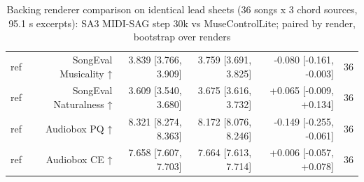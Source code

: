 \begin{table}[t]
\begin{tabular}{lrrrrr}
ref & SongEval Musicality ↑ & 3.839 [3.766, 3.909] & 3.759 [3.691, 3.825] & -0.080 [-0.161, -0.003] & 36 \\
ref & SongEval Naturalness ↑ & 3.609 [3.540, 3.680] & 3.675 [3.616, 3.732] & +0.065 [-0.009, +0.134] & 36 \\
ref & Audiobox PQ ↑ & 8.321 [8.274, 8.363] & 8.172 [8.076, 8.246] & -0.149 [-0.255, -0.061] & 36 \\
ref & Audiobox CE ↑ & 7.658 [7.607, 7.703] & 7.664 [7.613, 7.714] & +0.006 [-0.057, +0.078] & 36 \\
\bottomrule
\end{tabular}
\caption{Backing renderer comparison on identical lead sheets (36 songs x 3 chord sources, 95.1 s excerpts): SA3 MIDI-SAG step 30k vs MuseControlLite; paired by render, bootstrap over renders}
\label{tab:backing_sa3_vs_mcl}
\end{table}
